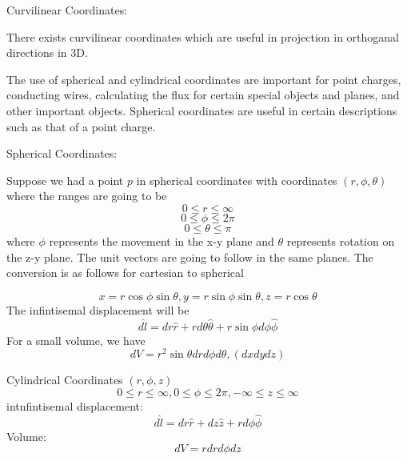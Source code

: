 \begin{remark}
    Curvilinear Coordinates:
    
    There exists curvilinear coordinates which are useful in projection in orthoganal directions in 3D. 
    \begin{eg}
        The use of spherical and cylindrical coordinates are important for point charges, conducting wires, calculating the flux
        for certain special objects and planes, and other important objects. Spherical coordinates are useful in certain
        descriptions such as that of a point charge.
    \end{eg}

    \begin{definition}
        Spherical Coordinates:

        Suppose we had a point \(p\) in spherical coordinates with coordinates \((r,\phi ,\theta )\) 
        where the ranges are going to be 
        \[
            0 \leq  r \leq  \infty
        \]
        \[
            0 \leq  \phi  \leq  2\pi 
        \]
        \[
            0 \leq  \theta  \leq  \pi 
        \]
        where \(\phi \) represents the movement in the x-y plane and \(\theta \) represents rotation on the z-y plane. 
        The unit vectors are going to follow in the same planes. The conversion is as follows for cartesian to spherical

        \[
            x = r \cos \phi \sin \theta, 
            y = r \sin  \phi \sin \theta, 
            z = r \cos \theta 
        \]
        The infintisemal displacement will be 
        \[
            d\hat{l} = dr \hat{r} + r d\theta \hat{\theta } + r \sin  \phi d \phi \hat{\phi }
        \]
        For a small volume, we have 
        \[
            dV = r^{2}  \sin \theta  dr d \phi  d \theta , (dxdydz)
        \]
    \end{definition}

    \begin{definition}
        Cylindrical Coordinates \((r,\phi ,z)\) 
        \[
            0 \leq  r \leq  \infty , 
            0 \leq  \phi  \leq  2\pi , 
            - \infty \leq  z \leq  \infty
        \]
        intnfintisemal displacement:
        \[
             d\hat{l} = dr \hat{r} + dz \hat{z} + r d \phi  \hat{\phi }
        \]
        Volume:
        \[
            dV = r dr d \phi  dz
        \]
    \end{definition}
\end{remark}